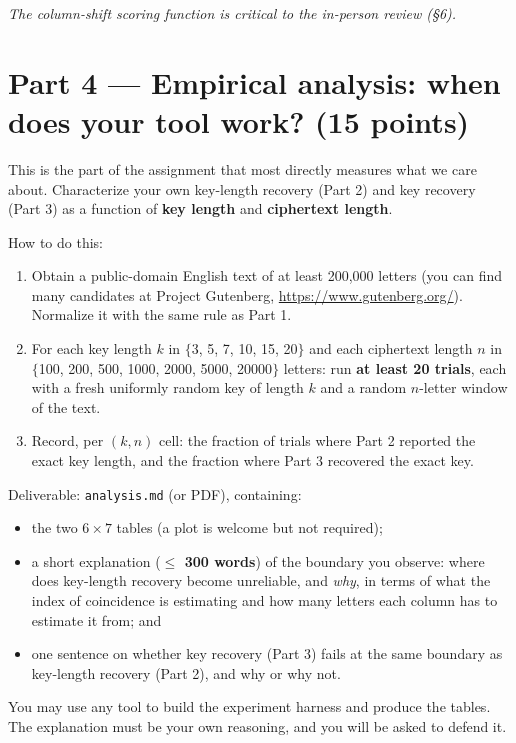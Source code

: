 \documentclass[11pt]{article}
\newcommand{\file}[1]{\texttt{#1}}
\begin{document}
\medskip \noindent
\emph{The column-shift scoring function is critical to the in-person review (\S6).}

\section*{Part 4 --- Empirical analysis: when does your tool work? (15 points)}

This is the part of the assignment that most directly measures what we care about. Characterize your own key-length recovery (Part 2) and key recovery (Part 3) as a function of \textbf{key length} and \textbf{ciphertext length}.

\medskip\noindent How to do this:

\medskip \noindent
\begin{enumerate}
\item Obtain a public-domain English text of at least 200,000 letters (you can find many candidates at Project Gutenberg, \url{https://www.gutenberg.org/}). Normalize it with the same rule as Part 1.
\item For each key length $k$ in $\{$3, 5, 7, 10, 15, 20$\}$ and each ciphertext length $n$ in $\{$100, 200, 500, 1000, 2000, 5000, 20000$\}$ letters: run \textbf{at least 20 trials}, each with a fresh uniformly random key of length $k$ and a random $n$-letter window of the text.
\item Record, per $(k, n)$ cell: the fraction of trials where Part 2 reported the exact key length, and the fraction where Part 3 recovered the exact key.
\end{enumerate}

\medskip \noindent
Deliverable: \file{analysis.md} (or PDF), containing:
\medskip \noindent
\begin{itemize}
\item the two $6 \times 7$ tables (a plot is welcome but not required);
\item a short explanation (\textbf{$\leq$ 300 words}) of the boundary you observe: where does key-length recovery become unreliable, and \emph{why}, in terms of what the index of coincidence is estimating and how many letters each column has to estimate it from; and
\item one sentence on whether key recovery (Part 3) fails at the same boundary as key-length recovery (Part 2), and why or why not.
\end{itemize}

\medskip \noindent
You may use any tool to build the experiment harness and produce the tables. The explanation must be your own reasoning, and you will be asked to defend it.
\end{document}
